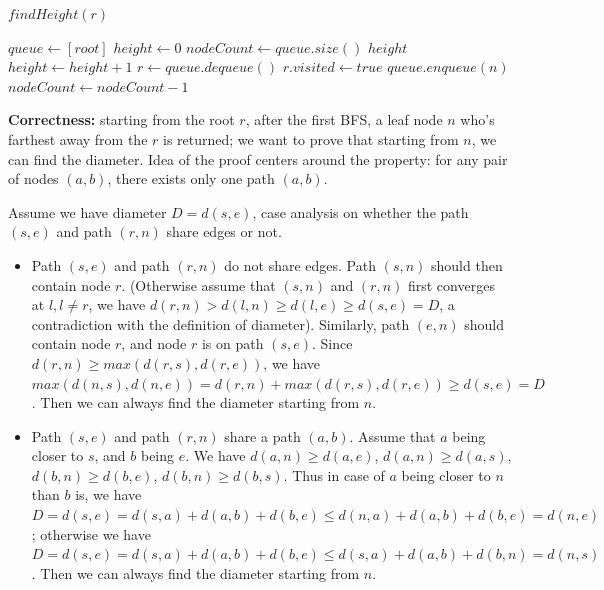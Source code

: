 \documentclass{article}
\begin{document}
\begin{description}
\begin{algorithm}[h]
\begin{algorithmic}[1]
      \State \Return $findHeight(r)$
    \EndFunction

      \State $queue \gets [root]$
      \State $height \gets 0$
        \State $nodeCount \gets queue.size()$
          \State \Return $height$
        \EndIf
        \State $height \gets height + 1$
          \State $r \gets queue.dequeue()$
          \State $r.visited \gets true$
            \State $queue.enqueue(n)$
          \EndFor
          \State $nodeCount \gets nodeCount - 1$
        \EndWhile
      \EndWhile
    \EndFunction

    \end{algorithmic}
  \end{algorithm}
  

  \textbf{Correctness:} starting from the root $r$, after the first BFS, a leaf node $n$ who's farthest away from the $r$ is returned; we want to prove that starting from $n$, we can find the diameter. Idea of the proof centers around the property: for any pair of nodes $(a,b)$, there exists only one path $(a,b)$.

  Assume we have diameter $D = d(s,e)$, case analysis on whether the path $(s,e)$ and path $(r,n)$ share edges or not.

  \begin{itemize}
    \item
    Path $(s,e)$ and path $(r,n)$ do not share edges. Path $(s,n)$ should then contain node $r$. (Otherwise assume that $(s, n)$ and $(r, n)$ first converges at $l, l \neq r$, we have $d(r, n) > d(l, n) \geq d(l,e) \geq d(s,e) = D$, a contradiction with the definition of diameter). Similarly, path $(e,n)$ should contain node $r$, and node $r$ is on path $(s,e)$. Since $d(r,n) \geq max(d(r,s), d(r,e))$, we have $max(d(n,s),d(n,e)) = d(r,n) + max(d(r,s), d(r,e)) \geq d(s,e) = D$. Then we can always find the diameter starting from $n$.

    \item
    Path $(s,e)$ and path $(r,n)$ share a path $(a,b)$. Assume that $a$ being closer to $s$, and $b$ being $e$. We have $d(a,n) \geq d(a,e)$, $d(a,n) \geq d(a,s)$, $d(b,n) \geq d(b,e)$, $d(b,n) \geq d(b,s)$. Thus in case of $a$ being closer to $n$ than $b$ is, we have $D = d(s,e) = d(s,a) + d(a,b) + d(b,e) \leq d(n,a) + d(a,b) + d(b,e) = d(n,e)$; otherwise we have $D = d(s,e) = d(s,a) + d(a,b) + d(b,e) \leq d(s,a) + d(a,b) + d(b,n) = d(n,s)$. Then we can always find the diameter starting from $n$.
  \end{itemize}


\end{description}
\end{document}
